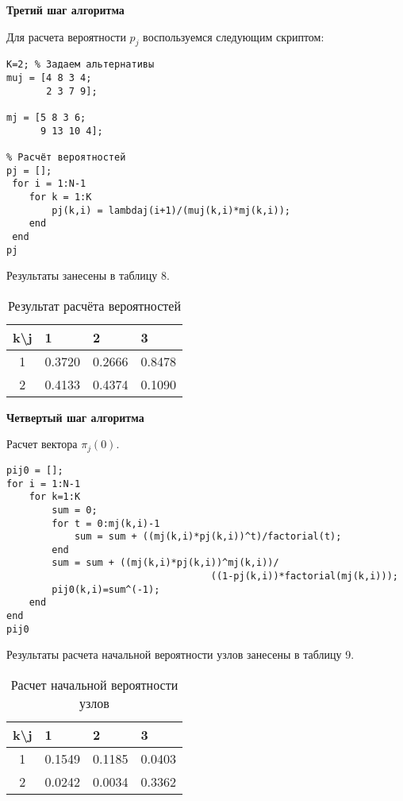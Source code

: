 \textbf{Третий шаг алгоритма}

Для расчета вероятности $p_j$ воспользуемся следующим скриптом:
\begin{Verbatim}[frame=single]
K=2; % Задаем альтернативы
muj = [4 8 3 4;
       2 3 7 9];
 
mj = [5 8 3 6;
      9 13 10 4];

% Расчёт вероятностей
pj = [];
 for i = 1:N-1
    for k = 1:K
        pj(k,i) = lambdaj(i+1)/(muj(k,i)*mj(k,i));
    end
 end
pj
\end{Verbatim}

Результаты занесены в таблицу 8.

\begin{table}[htb]
	\begin{tabularx}{\textwidth}{|c|X|X|X|}
	\hline 
	k\textbackslash{}j & 1 & 2 & 3 \\ 
	\hline 
	1 & 0.3720 & 0.2666 & 0.8478 \\
	\hline 
	2 & 0.4133 & 0.4374 & 0.1090 \\
	\hline 
	\end{tabularx}
\caption{Результат расчёта вероятностей}
\end{table}

\textbf{Четвертый шаг алгоритма}

Расчет вектора $\pi_j (0)$.

\begin{Verbatim}[frame=single]
% Расчет начальной вероятности для каждого узла.
pij0 = [];
for i = 1:N-1
    for k=1:K
        sum = 0;
        for t = 0:mj(k,i)-1
            sum = sum + ((mj(k,i)*pj(k,i))^t)/factorial(t);
        end
        sum = sum + ((mj(k,i)*pj(k,i))^mj(k,i))/
                                    ((1-pj(k,i))*factorial(mj(k,i)));
        pij0(k,i)=sum^(-1);
    end
end
pij0
\end{Verbatim}

Результаты расчета начальной вероятности узлов занесены в таблицу 9.

\begin{table}[htb]
	\begin{tabularx}{\textwidth}{|c|X|X|X|}
	\hline 
	k\textbackslash{}j & 1 & 2 & 3 \\ 
	\hline 
	1 & 0.1549 & 0.1185 & 0.0403 \\ 
	\hline 
	2 & 0.0242 & 0.0034 & 0.3362 \\ 
	\hline 
	\end{tabularx}
\caption{Расчет начальной вероятности узлов}
\end{table}

